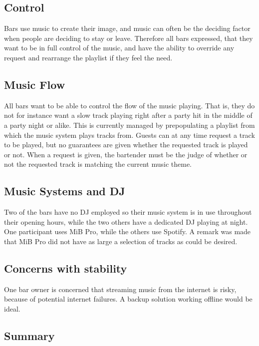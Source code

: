 \subsection{Control}
\label{sub:Control}
Bars use music to create their image, and music can often be the deciding factor when people are deciding to stay or leave. Therefore all bars expressed, that they want to be in full control of the music, and have the ability to override any request and rearrange the playlist if they feel the need.

\subsection{Music Flow}
\label{sub:MusicFlow}

All bars want to be able to control the flow of the music playing. That is, they do not for instance want a slow track playing right after a party hit in the middle of a party night or alike. This is currently managed by prepopulating a playlist from which the music system plays tracks from. Guests can at any time request a track to be played, but no guarantees are given whether the requested track is played or not. When a request is given, the bartender must be the judge of whether or not the requested track is matching the current music theme.

\subsection{Music Systems and DJ}
\label{sub:differences}
Two of the bars have no DJ employed so their music system is in use throughout their opening hours, while the two others have a dedicated DJ playing at night. One participant uses MiB Pro, while the others use Spotify. A remark was made that MiB Pro did not have as large a selection of tracks as could be desired.

\subsection{Concerns with stability}
\label{sub:specific_remarks}

One bar owner is concerned that streaming music from the internet is risky, because of potential internet failures. A backup solution working offline would be ideal.

\subsection{Summary}
\label{sub:summary}

